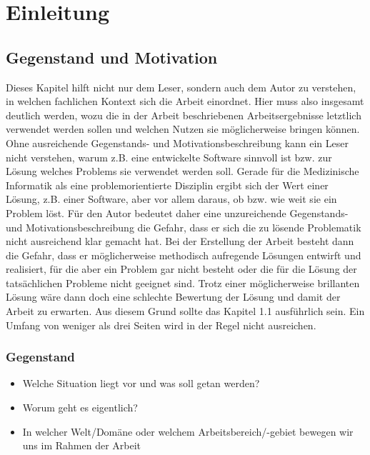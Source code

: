 \chapter{Einleitung}\label{ch:introduction}
\section{Gegenstand und Motivation}

Dieses Kapitel hilft nicht nur dem Leser, sondern auch dem Autor zu verstehen, in welchen fachlichen Kontext sich die Arbeit einordnet. Hier muss also insgesamt deutlich werden, wozu die in der Arbeit beschriebenen Arbeitsergebnisse letztlich verwendet werden sollen und welchen Nutzen sie möglicherweise bringen können.
Ohne ausreichende Gegenstands- und Motivationsbeschreibung kann ein Leser nicht verstehen, warum z.B. eine entwickelte Software sinnvoll ist bzw. zur Lösung welches Problems sie verwendet werden soll. Gerade für die Medizinische Informatik als eine problemorientierte Disziplin ergibt sich der Wert einer Lösung, z.B. einer Software, aber vor allem daraus, ob bzw. wie weit sie ein Problem löst.
Für den Autor bedeutet daher eine unzureichende Gegenstands- und Motivationsbeschreibung die Gefahr, dass er sich die zu lösende Problematik nicht ausreichend klar gemacht hat.
Bei der Erstellung der Arbeit besteht dann die Gefahr, dass er möglicherweise methodisch aufregende Lösungen entwirft und realisiert, für die aber ein Problem gar nicht besteht oder die für die Lösung der tatsächlichen Probleme nicht geeignet sind. Trotz einer möglicherweise brillanten Lösung wäre dann doch eine schlechte Bewertung der Lösung und damit der Arbeit zu erwarten.
Aus diesem Grund sollte das Kapitel 1.1 ausführlich sein. Ein Umfang von weniger als drei Seiten wird in der Regel nicht ausreichen.

\subsection{Gegenstand}

\begin{itemize}

\item Welche Situation liegt vor und was soll getan werden?
\item Worum geht es eigentlich?
\item In welcher Welt/Domäne oder welchem Arbeitsbereich/-gebiet bewegen wir uns im Rahmen der Arbeit

\end{itemize}

